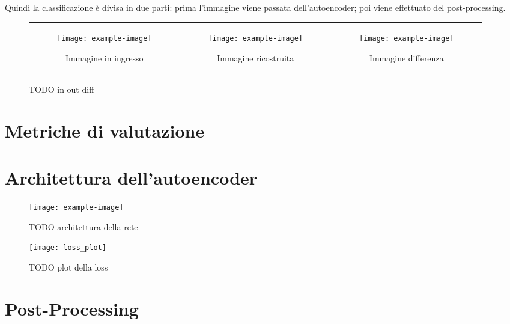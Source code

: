 Quindi la classificazione è divisa in due parti: prima l'immagine viene passata dell'autoencoder; poi viene effettuato del post-processing.

\begin{figure}[ht] %
  \begin{center}
    \begin{tabular}{ccc}

      \begin{subfigure}{.3\linewidth}
        \centering\texttt{[image: example-image]}
        \caption{Immagine in ingresso}
        \label{fig:obbiettivo_in}
      \end{subfigure} &

      \begin{subfigure}{.3\linewidth}
        \centering\texttt{[image: example-image]}
        \caption{Immagine ricostruita}
        \label{fig:obbiettivo_out}
      \end{subfigure} &

      \begin{subfigure}{.3\linewidth}
        \centering\texttt{[image: example-image]}
        \caption{Immagine differenza}
        \label{fig:obbiettivo_diff}
      \end{subfigure}

    \end{tabular}
    \caption{TODO in out diff}
    \label{fig:obbiettivo_in_out_diff}
  \end{center}
\end{figure}



\clearpage
\section{Metriche di valutazione}




\clearpage
\section{Architettura dell'autoencoder}

\begin{figure}[ht]
  \begin{center}
    \texttt{[image: example-image]}
    \caption{TODO architettura della rete}
    \label{fig:ae16_arch}
  \end{center}
\end{figure}

\begin{figure}[ht]
  \begin{center}
    \texttt{[image: loss\_plot]}
    \caption{TODO plot della loss}
    \label{fig:loss_plot}
  \end{center}
\end{figure}

\clearpage
\section{Post-Processing}
